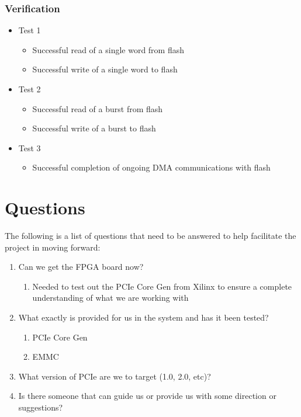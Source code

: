 \documentclass[]{report}   %
\begin{document}
\subsection{Verification}
\begin{itemize}
  \item{Test 1}
    \begin{itemize}
      \item{Successful read of a single word from flash}
      \item{Successful write of a single word to flash}
    \end{itemize}
  \item{Test 2}
    \begin{itemize}
      \item{Successful read of a burst from flash}
      \item{Successful write of a burst to flash}
    \end{itemize}
  \item{Test 3}
    \begin{itemize}
      \item{Successful completion of ongoing DMA communications with flash}
    \end{itemize}
\end{itemize}

\chapter{Questions}
The following is a list of questions that need to be answered to help facilitate the project in moving forward:
\linebreak

\begin{enumerate}
  \item{Can we get the FPGA board now?}
    \begin{enumerate}
      \item{Needed to test out the PCIe Core Gen from Xilinx to ensure a complete understanding of what we are working with}
    \end{enumerate}
  \item{What exactly is provided for us in the system and has it been tested?}
    \begin{enumerate}
      \item{PCIe Core Gen}
      \item{EMMC}
    \end{enumerate}
  \item{What version of PCIe are we to target (1.0, 2.0, etc)?}
  \item{Is there someone that can guide us or provide us with some direction or suggestions?}
\end{enumerate}

\end{document}
